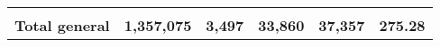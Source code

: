 \begin{tabular}{lrcclr}
	& \multicolumn{1}{l}{}                                           & \multicolumn{1}{l}{}                                       & \multicolumn{1}{l}{} &                                                                     & \multicolumn{1}{l}{}                                                         \\
	\rowcolor[HTML]{DDEBF7} 
	\textbf{Total   general}                                       & \textbf{1,357,075}                                             & \multicolumn{1}{r}{\cellcolor[HTML]{DDEBF7}\textbf{3,497}} & \textbf{33,860}      & \textbf{37,357}                                                     & \textbf{275.28}                                                             
\end{tabular}